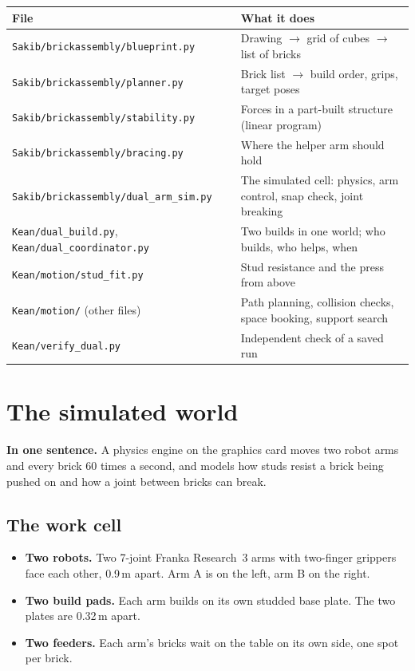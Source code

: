 \documentclass[11pt,a4paper]{article}
\newcommand{\keyidea}[1]{\par\smallskip\noindent\colorbox{keyc}{\parbox{\dimexpr\linewidth-2\fboxsep}{\small\textbf{In one sentence.} #1}}\par\smallskip}
\begin{document}
\begin{center}
\small
\begin{tabularx}{\linewidth}{@{}lX@{}}
\toprule
File & What it does \\
\midrule
\texttt{Sakib/brickassembly/blueprint.py} & Drawing $\to$ grid of cubes $\to$ list of bricks \\
\texttt{Sakib/brickassembly/planner.py} & Brick list $\to$ build order, grips, target poses \\
\texttt{Sakib/brickassembly/stability.py} & Forces in a part-built structure (linear program) \\
\texttt{Sakib/brickassembly/bracing.py} & Where the helper arm should hold \\
\texttt{Sakib/brickassembly/dual\_arm\_sim.py} & The simulated cell: physics, arm control, snap check, joint breaking \\
\texttt{Kean/dual\_build.py}, \texttt{Kean/dual\_coordinator.py} & Two builds in one world; who builds, who helps, when \\
\texttt{Kean/motion/stud\_fit.py} & Stud resistance and the press from above \\
\texttt{Kean/motion/} (other files) & Path planning, collision checks, space booking, support search \\
\texttt{Kean/verify\_dual.py} & Independent check of a saved run \\
\bottomrule
\end{tabularx}
\end{center}

\section{The simulated world}\label{sec:world}

\keyidea{A physics engine on the graphics card moves two robot arms and every brick
60 times a second, and models how studs resist a brick being pushed on and
how a joint between bricks can break.}

\subsection{The work cell}

\begin{itemize}
\item \textbf{Two robots.} Two 7-joint Franka Research~3 arms with two-finger
      grippers face each other, 0.9\,m apart. Arm A is on the left, arm B on the right.
\item \textbf{Two build pads.} Each arm builds on its own studded base plate. The
      two plates are 0.32\,m apart.
\item \textbf{Two feeders.} Each arm's bricks wait on the table on its own side, one
      spot per brick.
\end{itemize}
\end{document}
